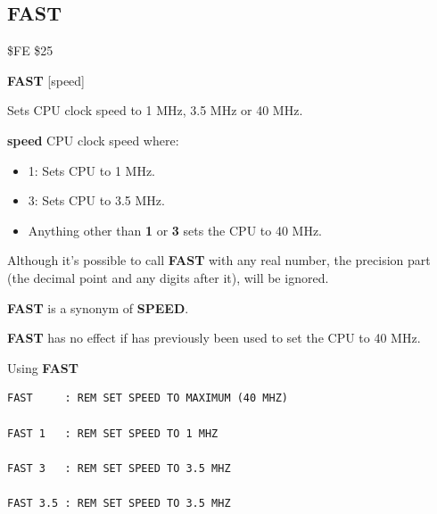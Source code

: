 \subsection{FAST}
\begin{description}[leftmargin=2cm,style=nextline]
\item [Token:]    \$FE \$25

\item [Format:]   {\bf FAST} [speed]

\item [Usage:]    Sets CPU clock speed to 1 MHz, 3.5 MHz or 40 MHz.

                  {\bf speed} CPU clock speed where:

                  \begin{itemize}
                     \item 1: Sets CPU to 1 MHz.
                     \item 3: Sets CPU to 3.5 MHz.
                     \item Anything other than {\bf 1} or {\bf 3} sets the CPU to 40 MHz.
                  \end{itemize}

\item [Remarks:]  Although it's possible to call {\bf FAST} with any real number, the precision part (the decimal point and any digits after it), will be ignored.

                  {\bf FAST} is a synonym of {\bf SPEED}.

                  {\bf FAST} has no effect if  has previously been used to set the CPU to 40 MHz.

\item [Examples:] Using {\bf FAST}

\begin{tcolorbox}[colback=black,coltext=white]
\verbatimfont{\codefont}
\begin{verbatim}
FAST     : REM SET SPEED TO MAXIMUM (40 MHZ)

FAST 1   : REM SET SPEED TO 1 MHZ

FAST 3   : REM SET SPEED TO 3.5 MHZ

FAST 3.5 : REM SET SPEED TO 3.5 MHZ
\end{verbatim}
\end{tcolorbox}
\end{description}


